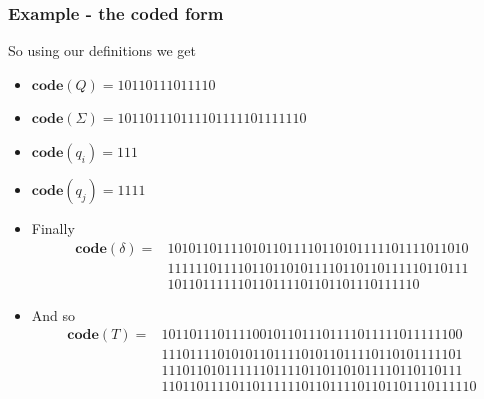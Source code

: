 \documentclass[handout]{beamer}
\newcommand{\co}{\mathbf{code}}
\begin{document}
\begin{frame}
\frametitle{Example - the coded form}
So using our definitions we get 
\begin{itemize}
\item $\co(Q)=10110111011110$
\item $\co(\Sigma)=101101110111101111101111110$
\item $\co(q_i)=111$
\item $\co(q_j)=1111$
\item Finally \begin{align*}\co(\delta)=&1010110111101011011110110101111101111011010 \\
                                        &1111110111101101101011110110110111110110111 \\
																				&101101111110110111101101101110111110\end{align*}
\item And so \begin{align*} \co(T)=     &1011011101111001011011101111011111011111100 \\
                                        &1110111101010110111101011011110110101111101\\
																				&1110110101111110111101101101011110110110111\\
																				&110110111101101111110110111101101101110111110                                    																
                                       \end{align*}
\end{itemize}
\end{frame}
\end{document}
